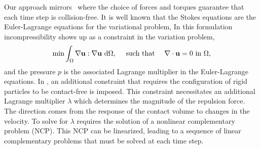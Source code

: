 \documentclass[preprint, 10pt]{elsarticle}
\begin{document}
Our approach mirrors~\cite{Lu2017} where the choice of forces and
torques guarantee that each time step is collision-free.
It is well known that the Stokes equations are the Euler-Lagrange
equations for the variational problem, 
In this formulation incompressibility shows up as a constraint in the
variation problem, 
\begin{align*}
  \min \int_{\Omega} \nabla{\mathbf{u}}:\nabla{\mathbf{u}}~\text{d}\Omega,
  \quad\text{ such that }\quad \nabla\cdot{\mathbf{u}} = 0 \text{ in }\Omega,
\end{align*} 
and the pressure $p$ is the associated Lagrange
multiplier in the Euler-Lagrange equations. In \cite{Lu2017}, an
additional constraint that requires the configuration of rigid particles
to be contact-free is imposed. This constraint necessitates an
additional Lagrange multiplier $\lambda$ which determines the magnitude
of the repulsion force. The direction comes from the response of the
contact volume to changes in the velocity. To solve for $\lambda$
requires the solution of a nonlinear complementary problem (NCP). This
NCP can be linearized, leading to a sequence of linear complementary
problems that must be solved at each time step.
\end{document}
